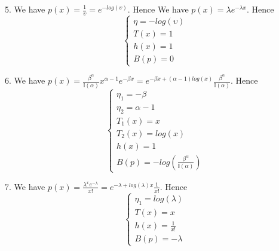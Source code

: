 \documentclass[10pt]{article}
\newenvironment{problem}[2][Problem]{\begin{trivlist}
\item[\hskip \labelsep {\bfseries #1}\hskip \labelsep {\bfseries #2.}]}{\end{trivlist}}
\begin{document}
\begin{problem}{1}
\item 5.
We have $p(x)= \frac{1}{\upsilon} = e^{-log(\upsilon)}$. Hence
We have $p(x) = \lambda e^{-\lambda x}$. Hence
\[ \begin{cases} \eta=-log(\upsilon) \\  T(x)= 1  \\ h(x) = 1 \\ B(p)=0   \end{cases}\]

\item 6.
We have $p(x) = \frac{\beta^{\alpha}}{\mathbb{I}(\alpha)}x^{\alpha - 1}e^{-\beta x} = e^{-\beta x + (\alpha -1)log(x)}\frac{\beta^{\alpha}}{\mathbb{I}(\alpha)}$. Hence
\[\begin{cases} \eta_{1}=-\beta \\ \eta_{2} = \alpha -1 \\ T_{1}(x)= x \\ T_{2}(x)=log(x) \\ h(x) = 1 \\ B(p)= -log(\frac{\beta^{\alpha}}{\mathbb{I}(\alpha)})   \end{cases} \] 

\item 7.
We have $p(x) = \frac{\lambda^{x} e^{-\lambda}}{x!} = e^{-\lambda + log(\lambda) x}\frac{1}{x!}$. Hence
\[\begin{cases} \eta_{1}=log(\lambda)\\  T(x)= x \\  h(x) = \frac{1}{x!} \\ B(p)= -\lambda   \end{cases} \]

\end{problem}
\end{document}

